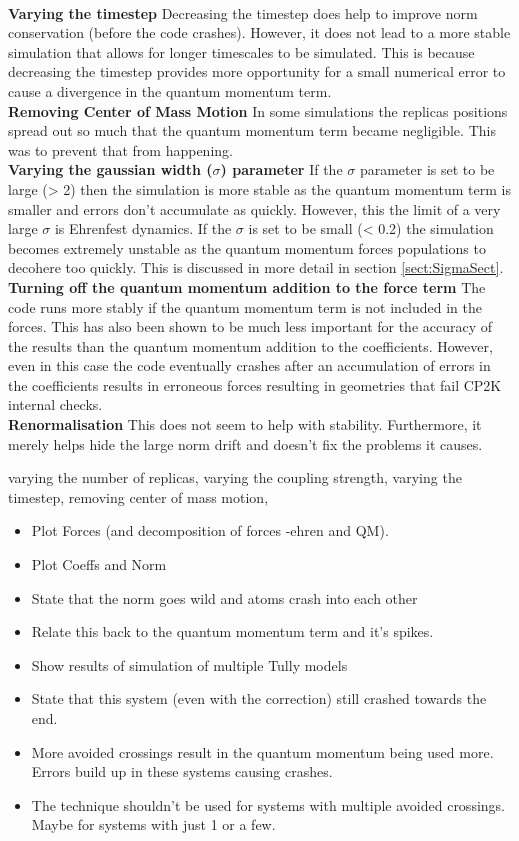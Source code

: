 \\
\textbf{Varying the timestep}
Decreasing the timestep does help to improve norm conservation (before the code crashes). However, it does not lead to a more stable simulation that allows for longer timescales to be simulated. This is because decreasing the timestep provides more opportunity for a small numerical error to cause a divergence in the quantum momentum term.
\\
\textbf{Removing Center of Mass Motion}
In some simulations the replicas positions spread out so much that the quantum momentum term became negligible. This was to prevent that from happening.
\\
\textbf{Varying the gaussian width ($\sigma$) parameter}
If the $\sigma$ parameter is set to be large (> 2) then the simulation is more stable as the quantum momentum term is smaller and errors don't accumulate as quickly. However, this the limit of a very large $\sigma$ is Ehrenfest dynamics. If the $\sigma$ is set to be small (< 0.2) the simulation becomes extremely unstable as the quantum momentum forces populations to decohere too quickly. This is discussed in more detail in section \ref{sect:SigmaSect}.
\\
\textbf{Turning off the quantum momentum addition to the force term}
The code runs more stably if the quantum momentum term is not included in the forces. This has also been shown to be much less important for the accuracy of the results than the quantum momentum addition to the coefficients. However, even in this case the code eventually crashes after an accumulation of errors in the coefficients results in erroneous forces resulting in geometries that fail CP2K internal checks.
\\
\textbf{Renormalisation}
This does not seem to help with stability. Furthermore, it merely helps hide the large norm drift and doesn't fix the problems it causes.


varying the number of replicas, varying the coupling strength, varying the timestep, removing center of mass motion, 



\begin{itemize}
	\item Plot Forces (and decomposition of forces -ehren and QM).
	\item Plot Coeffs and Norm
	\item State that the norm goes wild and atoms crash into each other
	\item Relate this back to the quantum momentum term and it's spikes.
	\item Show results of simulation of multiple Tully models
	\item State that this system (even with the correction) still crashed towards the end.
	\item More avoided crossings result in the quantum momentum being used more. Errors build up in these systems causing crashes.
	\item The technique shouldn't be used for systems with multiple avoided crossings. Maybe for systems with just 1 or a few.
\end{itemize}



